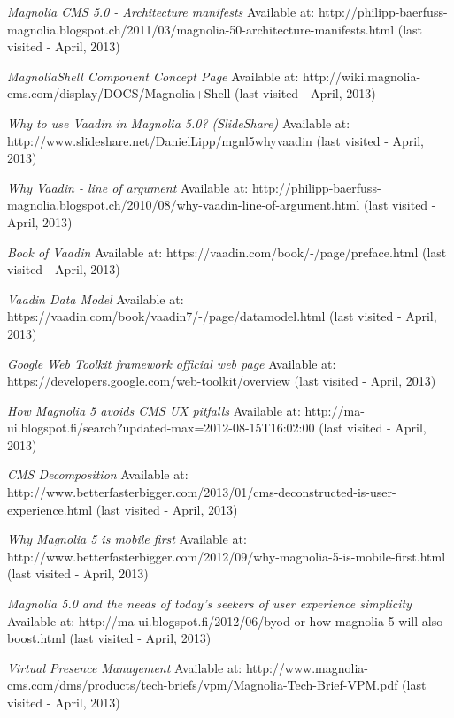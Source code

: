 \begin{thebibliography}{9}
\emph{Magnolia CMS 5.0 - Architecture manifests} 
Available at: http://philipp-baerfuss-magnolia.blogspot.ch/2011/03/magnolia-50-architecture-manifests.html (last visited - April, 2013) 
  
\emph{MagnoliaShell Component Concept Page} 
Available at: http://wiki.magnolia-cms.com/display/DOCS/Magnolia+Shell (last visited - April, 2013)
 
\emph{Why to use Vaadin in Magnolia 5.0? (SlideShare)} 
Available at: http://www.slideshare.net/DanielLipp/mgnl5whyvaadin (last visited - April, 2013)

\emph{Why Vaadin - line of argument} 
Available at: http://philipp-baerfuss-magnolia.blogspot.ch/2010/08/why-vaadin-line-of-argument.html (last visited - April, 2013)
  
\emph{Book of Vaadin}
Available at: https://vaadin.com/book/-/page/preface.html (last visited - April, 2013)

\emph{Vaadin Data Model}
Available at: https://vaadin.com/book/vaadin7/-/page/datamodel.html (last visited - April, 2013)
 
\emph{Google Web Toolkit framework official web page} 
Available at: https://developers.google.com/web-toolkit/overview (last visited - April, 2013)
  
\emph{How Magnolia 5 avoids CMS UX pitfalls}  
Available at: http://ma-ui.blogspot.fi/search?updated-max=2012-08-15T16:02:00%
(last visited - April, 2013)

\emph{CMS Decomposition}  
Available at: http://www.betterfasterbigger.com/2013/01/cms-deconstructed-is-user-experience.html (last visited - April, 2013)
 
\emph{Why Magnolia 5 is mobile first}  
Available at: http://www.betterfasterbigger.com/2012/09/why-magnolia-5-is-mobile-first.html (last visited - April, 2013)
 
\emph{Magnolia 5.0 and the needs of today's seekers of user experience simplicity}
Available at: http://ma-ui.blogspot.fi/2012/06/byod-or-how-magnolia-5-will-also-boost.html (last visited - April, 2013)
 
\emph{Virtual Presence Management} 
 Available at: http://www.magnolia-cms.com/dms/products/tech-briefs/vpm/Magnolia-Tech-Brief-VPM.pdf (last visited - April, 2013)
 

\end{thebibliography}
